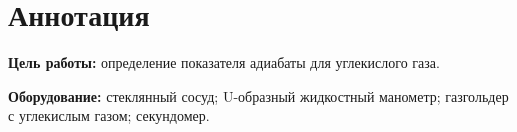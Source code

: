 \section{Аннотация}
\textbf{Цель работы:} определение показателя адиабаты для углекислого газа.

\textbf{Оборудование:} стеклянный сосуд; U-образный жидкостный манометр; газгольдер с углекислым газом; секундомер. 